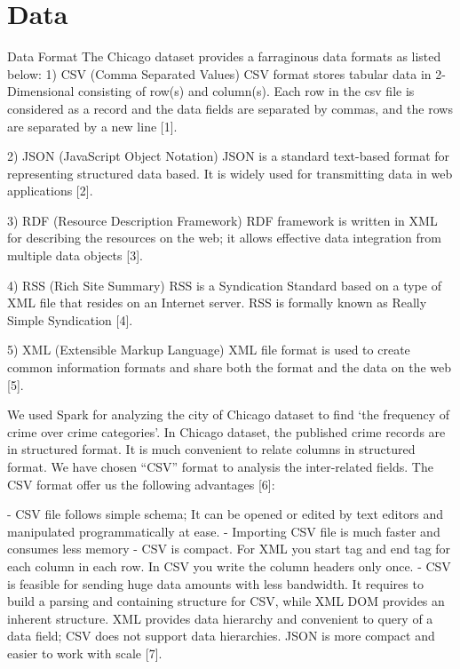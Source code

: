 \section{Data}

Data Format 
The Chicago dataset provides a farraginous data formats as listed below:
1) CSV (Comma Separated Values) 
CSV format stores tabular data in 2-Dimensional consisting of row(s) and column(s). Each row in the csv file is considered as a record and the data fields are separated by commas, and the rows are separated by a new line [1].

2) JSON (JavaScript Object Notation) 
JSON is a standard text-based format for representing structured data based. It is widely used for transmitting data in web applications [2].

3) RDF (Resource Description Framework)
	RDF framework is written in XML for describing the resources on the web; it allows effective data integration from multiple data objects [3].
	
4) RSS (Rich Site Summary)
	RSS is a Syndication Standard based on a type of XML file that resides on an Internet server. RSS is formally known as Really Simple Syndication [4].

5) XML (Extensible Markup Language)
	XML file format is used to create common information formats and share both the format and the data on the web [5].

We used Spark for analyzing the city of Chicago dataset to find ‘the frequency of crime over crime categories’. In Chicago dataset, the published crime records are in structured format. It is much convenient to relate columns in structured format. We have chosen “CSV” format to analysis the inter-related fields. The CSV format offer us the following advantages [6]:

-	CSV file follows simple schema; It can be opened or edited by text editors and manipulated programmatically at ease.
-	Importing CSV file is much faster and consumes less memory
-	CSV is compact. For XML you start tag and end tag for each column in each row. In CSV you write the column headers only once.
-	CSV is feasible for sending huge data amounts with less bandwidth.
It requires to build a parsing and containing structure for CSV, while XML DOM provides an inherent structure. XML provides data hierarchy and convenient to query of a data field; CSV does not support data hierarchies. JSON is more compact and easier to work with scale [7].
 
